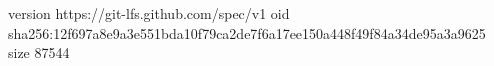version https://git-lfs.github.com/spec/v1
oid sha256:12f697a8e9a3e551bda10f79ca2de7f6a17ee150a448f49f84a34de95a3a9625
size 87544
